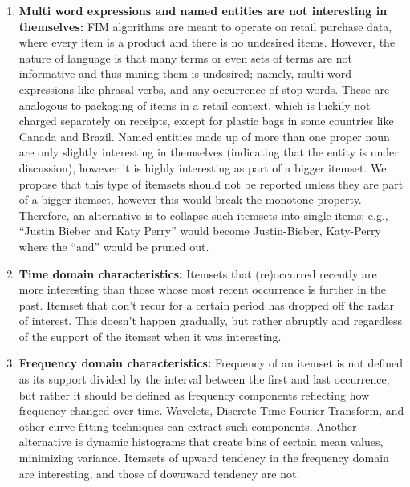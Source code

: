 \documentclass[11pt]{llncs} %
\begin{document}

\begin{enumerate}
\item {\bf Multi word expressions and named entities are not interesting in themselves:} FIM algorithms are meant to operate on  retail purchase data, where every item is a product and there is no undesired items. However, the nature of language is that many terms or even sets of terms are not informative and thus mining them is undesired; namely, multi-word expressions like phrasal verbs, and any occurrence of stop words. These are analogous to packaging of items in a retail context, which is luckily not charged separately on receipts, except for plastic bags in some countries like Canada and Brazil. Named entities made up of more than one proper noun are only slightly interesting in themselves (indicating that the entity is under discussion), however it is highly interesting as part of a bigger itemset. We propose that this type of itemsets should not be reported unless they are part of a bigger itemset, however this would break the monotone property. Therefore, an alternative is to collapse such itemsets into single items; e.g., ``Justin Bieber and Katy Perry'' would become Justin-Bieber, Katy-Perry where the ``and'' would be pruned out.

\item {\bf Time domain characteristics:} Itemsets that (re)occurred recently are more interesting than those whose most recent occurrence is further in the past. Itemset that don't recur for a certain period has dropped off the radar of interest. This doesn't happen gradually, but rather abruptly and regardless of the support  of the itemset when it was interesting. 

\item {\bf Frequency domain characteristics:} Frequency of an itemset is not defined as its support divided by the interval between the first and last occurrence, but rather it should be defined as frequency components reflecting how frequency changed over time. Wavelets, Discrete Time Fourier Transform, and other curve fitting techniques can extract such components. Another alternative is dynamic histograms that create bins of certain mean values, minimizing variance. Itemsets of upward tendency in the frequency domain are interesting, and those of downward tendency are not.


\end{enumerate}
\end{document}
